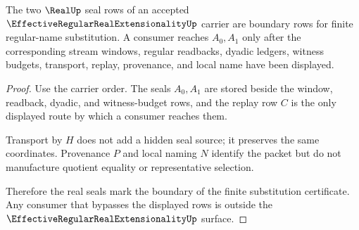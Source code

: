 \begin{theorem}
\label{thm:effective-regular-real-extensionality-real-seal-boundary}
The two $\RealUp$ seal rows of an accepted $\EffectiveRegularRealExtensionalityUp$ carrier are boundary rows for finite regular-name substitution. A consumer reaches $A_0,A_1$ only after the corresponding stream windows, regular readbacks, dyadic ledgers, witness budgets, transport, replay, provenance, and local name have been displayed.
\end{theorem}
\begin{proof}
Use the carrier order. The seals $A_0,A_1$ are stored beside the window, readback, dyadic, and witness-budget rows, and the replay row $C$ is the only displayed route by which a consumer reaches them.

Transport by $H$ does not add a hidden seal source; it preserves the same coordinates. Provenance $P$ and local naming $N$ identify the packet but do not manufacture quotient equality or representative selection.

Therefore the real seals mark the boundary of the finite substitution certificate. Any consumer that bypasses the displayed rows is outside the $\EffectiveRegularRealExtensionalityUp$ surface.
\end{proof}




